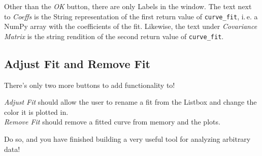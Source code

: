 \documentclass[
	english,
	fontsize=10pt,
	parskip=half,
	titlepage=true,
	DIV=12
]{scrartcl}
\newcommand*{\ie}{i.\,e.\xspace}
\begin{document}
Other than the \emph{OK} button, there are only Labels in the window. The text next to \emph{Coeffs} is the String representation of the first return value of \texttt{curve\_fit}, \ie a NumPy array with the coefficients of the fit. Likewise, the text under \emph{Covariance Matrix} is the string rendition of the second return value of \texttt{curve\_fit}.

\subsection{Adjust Fit and Remove Fit}
There's only two more buttons to add functionality to!

\emph{Adjust Fit} should allow the user to rename a fit from the Listbox and change the color it is plotted in.\\
\emph{Remove Fit} should remove a fitted curve from memory and the plots.

Do so, and you have finished building a very useful tool for analyzing arbitrary data!
\end{document}
